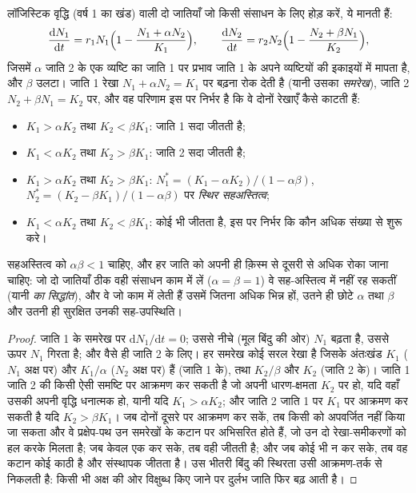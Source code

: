 \begin{theorem}[लॉटका--वोल्तेरा होड़]\label{thm:b2:speciation:lv}
लॉजिस्टिक वृद्धि (वर्ष 1 का खंड) वाली दो जातियाँ जो किसी
संसाधन के लिए होड़ करें, ये मानती हैं:
\[
\frac{\mathrm{d}N_1}{\mathrm{d}t} = r_1 N_1\Bigl(1 - \frac{N_1 + \alpha N_2}{K_1}\Bigr), \qquad
\frac{\mathrm{d}N_2}{\mathrm{d}t} = r_2 N_2\Bigl(1 - \frac{N_2 + \beta N_1}{K_2}\Bigr),
\]
जिसमें $\alpha$ जाति 2 के एक व्यष्टि का जाति 1 पर प्रभाव
जाति 1 के अपने व्यष्टियों की इकाइयों में मापता है, और $\beta$
उलटा। जाति 1 रेखा $N_1 + \alpha N_2 =
K_1$ पर बढ़ना रोक देती है (यानी उसका \emph{समरेख}), जाति 2 $N_2 + \beta N_1 = K_2$ पर, और
वह परिणाम इस पर निर्भर है कि वे दोनों रेखाएँ कैसे काटती हैं:
\begin{itemize}
  \item $K_1 > \alpha K_2$ तथा $K_2 < \beta K_1$: जाति 1 सदा
        जीतती है;
  \item $K_1 < \alpha K_2$ तथा $K_2 > \beta K_1$: जाति 2 सदा
        जीतती है;
  \item $K_1 > \alpha K_2$ तथा $K_2 > \beta K_1$: $N_1^{*} = (K_1 - \alpha K_2)/(1 - \alpha\beta)$,
        $N_2^{*} = (K_2 - \beta K_1)/(1 - \alpha\beta)$ पर \emph{स्थिर
        सहअस्तित्व};
  \item $K_1 < \alpha K_2$ तथा $K_2 < \beta K_1$: कोई भी जीतता है,
        इस पर निर्भर कि कौन अधिक संख्या से शुरू करे।
\end{itemize}
सहअस्तित्व को $\alpha\beta < 1$ चाहिए, और हर जाति को अपनी ही क़िस्म से
दूसरी से अधिक रोका जाना चाहिए: जो दो जातियाँ ठीक वही संसाधन काम में लें
($\alpha = \beta = 1$) वे सह-अस्तित्व में नहीं रह सकतीं
(यानी \emph{ का सिद्धांत}), और वे जो काम में लेती हैं उसमें जितना
अधिक भिन्न हों, उतने ही छोटे $\alpha$ तथा $\beta$ और उतनी ही
सुरक्षित उनकी सह-उपस्थिति।
\end{theorem}
\begin{proof}
जाति 1 के समरेख पर $\mathrm{d}N_1/\mathrm{d}t = 0$; उससे नीचे
(मूल बिंदु की ओर) $N_1$ बढ़ता है, उससे ऊपर $N_1$ गिरता है; और वैसे ही
जाति 2 के लिए। हर समरेख कोई सरल रेखा है जिसके अंतःखंड $K_1$ ($N_1$ अक्ष पर)
और $K_1/\alpha$ ($N_2$ अक्ष पर) हैं (जाति 1 के),
तथा $K_2/\beta$ और $K_2$ (जाति 2 के)। जाति 1 जाति 2 की किसी ऐसी समष्टि पर
आक्रमण कर सकती है जो अपनी धारण-क्षमता $K_2$ पर हो, यदि वहाँ उसकी अपनी
वृद्धि धनात्मक हो, यानी यदि $K_1 > \alpha K_2$; और जाति 2 जाति 1 पर $K_1$ पर
आक्रमण कर सकती है यदि $K_2 > \beta K_1$। जब दोनों दूसरे पर आक्रमण कर सकें,
तब किसी को अपवर्जित नहीं किया जा सकता और वे प्रक्षेप-पथ उन समरेखों के
कटान पर अभिसरित होते हैं, जो उन दो रेखा-समीकरणों को हल करके मिलता है;
जब केवल एक कर सके, तब वही जीतती है; और जब कोई भी न कर सके, तब वह
कटान कोई काठी है और संस्थापक जीतता है। उस भीतरी बिंदु की स्थिरता
उसी आक्रमण-तर्क से निकलती है: किसी भी अक्ष की ओर विक्षुब्ध किए जाने पर
दुर्लभ जाति फिर बढ़ आती है।
\end{proof}


